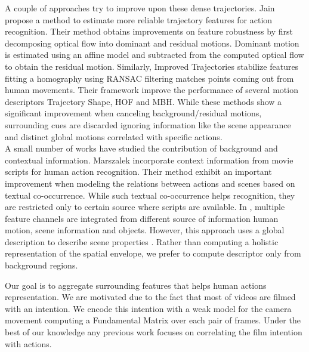 A couple of approaches try to improve upon these dense trajectories. Jain \etal \cite{jain2013} propose a method to estimate more reliable trajectory features for action recognition. Their method obtains improvements on feature robustness by first decomposing optical flow into dominant and residual motions. Dominant motion is estimated using an affine model and subtracted from the computed optical flow to obtain the residual motion. Similarly, Improved Trajectories \cite{wang2013} stabilize features fitting a homography using RANSAC filtering matches points coming out from human movements. Their framework improve the performance of several motion descriptors \ie Trajectory Shape, HOF and MBH. While these methods show a significant improvement when canceling background/residual motions, surrounding cues are discarded ignoring information like the scene appearance and distinct global motions correlated with specific actions.\\
A small number of works have studied the contribution of background and contextual information. Marszalek \etal \cite{marszalek2009} incorporate context information from movie scripts for human action recognition. Their method exhibit an important improvement when modeling the relations between actions and scenes based on textual co-occurrence. While such textual co-occurrence helps recognition, they are restricted only to certain source where scripts are available. In \cite{ikizler2010}, multiple feature channels are integrated from different source of information \ie human motion, scene information and objects. However, this approach uses a global description to describe scene properties \cite{oliva2001}. Rather than computing a holistic representation of the spatial envelope, we prefer to compute descriptor only from background regions. 

Our goal is to aggregate surrounding features that helps human actions representation. We are motivated due to the fact that most of videos are filmed with an intention. We encode this intention with a weak model for the camera movement computing a Fundamental Matrix over each pair of frames. Under the best of our knowledge any previous work focuses on correlating the film intention with actions.








